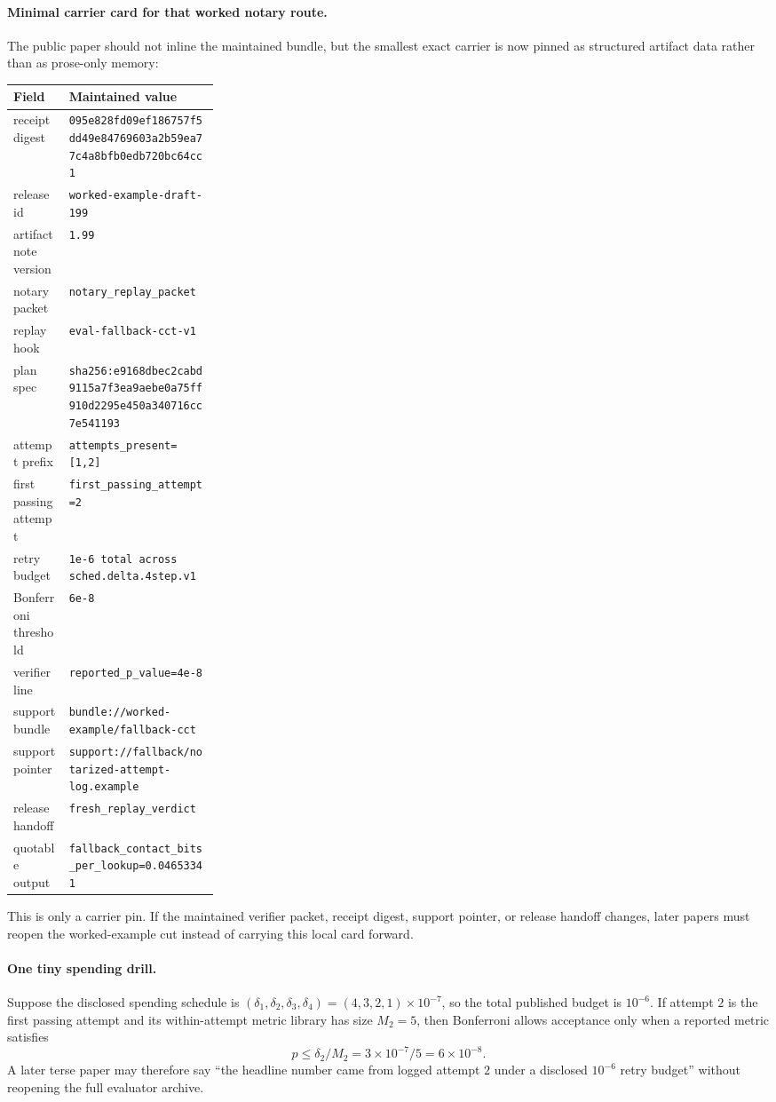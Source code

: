 \documentclass[11pt]{article}
\begin{document}
\paragraph{Minimal carrier card for that worked notary route.}
The public paper should not inline the maintained bundle, but the smallest exact carrier is now pinned as structured artifact data rather than as prose-only memory:
\begin{center}
\small
\begin{tabularx}{0.97\linewidth}{@{}L{0.27\linewidth}Y@{}}
\toprule
Field & Maintained value \\
\midrule
receipt digest & \nolinkurl{095e828fd09ef186757f5dd49e84769603a2b59ea77c4a8bfb0edb720bc64cc1} \\
release id & \nolinkurl{worked-example-draft-199} \\
artifact note version & \nolinkurl{1.99} \\
notary packet & \nolinkurl{notary_replay_packet} \\
replay hook & \nolinkurl{eval-fallback-cct-v1} \\
plan spec & \nolinkurl{sha256:e9168dbec2cabd9115a7f3ea9aebe0a75ff910d2295e450a340716cc7e541193} \\
attempt prefix & \nolinkurl{attempts_present=[1,2]} \\
first passing attempt & \nolinkurl{first_passing_attempt=2} \\
retry budget & \nolinkurl{1e-6 total across sched.delta.4step.v1} \\
Bonferroni threshold & \nolinkurl{6e-8} \\
verifier line & \nolinkurl{reported_p_value=4e-8} \\
support bundle & \nolinkurl{bundle://worked-example/fallback-cct} \\
support pointer & \nolinkurl{support://fallback/notarized-attempt-log.example} \\
release handoff & \nolinkurl{fresh_replay_verdict} \\
quotable output & \nolinkurl{fallback_contact_bits_per_lookup=0.04653341} \\
\bottomrule
\end{tabularx}
\end{center}
This is only a carrier pin. If the maintained verifier packet, receipt digest, support pointer, or release handoff changes, later papers must reopen the worked-example cut instead of carrying this local card forward.

\paragraph{One tiny spending drill.}
Suppose the disclosed spending schedule is $(\delta_1,\delta_2,\delta_3,\delta_4)=(4,3,2,1)\times 10^{-7}$, so the total published budget is $10^{-6}$.
If attempt $2$ is the first passing attempt and its within-attempt metric library has size $M_2=5$, then Bonferroni allows acceptance only when a reported metric satisfies
\[
p \le \delta_2/M_2 = 3\times 10^{-7}/5 = 6\times 10^{-8}.
\]
A later terse paper may therefore say ``the headline number came from logged attempt $2$ under a disclosed $10^{-6}$ retry budget'' without reopening the full evaluator archive.
\end{document}
